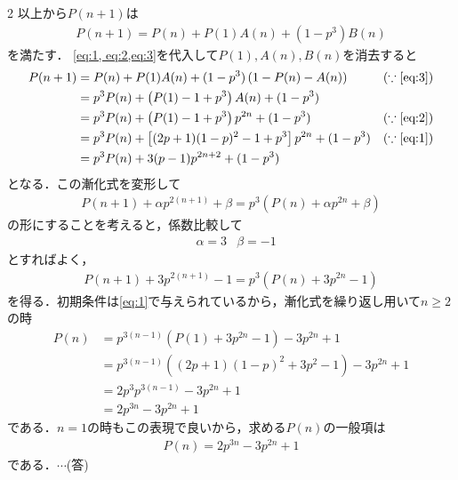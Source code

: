 \documentclass[../../main.tex]{subfiles}
\begin{document}
\begin{multicols}{2}
  以上から$P(n+1)$は
  \begin{align}
    P(n+1) = P(n) + P(1)A(n) + (1-p^3) B(n)
  \end{align}
  を満たす．
  \cref{eq:1, eq:2,eq:3}を代入して$P(1),A(n),B(n)$を消去すると
  \begin{align}
    P(n+1)
    & = P(n) + P(1)A(n) + (1-p^3) \left(1-P(n)-A(n)\right)         & (\because \text{\cref{eq:3}}) \\
    & = p^3P(n) + \left(P(1)-1+p^3\right)A(n) + (1-p^3)            &                                      \\
    & = p^3P(n) + \left(P(1)-1+p^3\right)p^{2n} + (1-p^3)          & (\because \text{\cref{eq:2}}) \\
    & = p^3P(n) + \left[(2p+1)(1-p)^2-1+p^3\right]p^{2n} + (1-p^3) & (\because \text{\cref{eq:1}}) \\
    & = p^3P(n) + 3(p-1)p^{2n+2} + (1-p^3)                         &
  \end{align}
  となる．この漸化式を変形して
  \begin{align}
    P(n+1) + \alpha p^{2(n+1)} + \beta = p^3\left(P(n)+\alpha p^{2n}+\beta \right)
  \end{align}
  の形にすることを考えると，係数比較して
  \begin{align}
    & \alpha= 3 & \beta = -1
  \end{align}
  とすればよく，
  \begin{align}
    P(n+1) + 3p^{2(n+1)} -1 = p^3\left(P(n)+ 3p^{2n}-1\right)
  \end{align}
  を得る．初期条件は\cref{eq:1}で与えられているから，漸化式を繰り返し用いて$n\ge 2$の時
  \begin{align}
    P(n)
    & = p^{3(n-1)}\left(P(1)+ 3p^{2n}-1\right) - 3p^{2n} + 1         \\
    & = p^{3(n-1)}\left((2p+1)(1-p)^2+ 3p^{2}-1\right) - 3p^{2n} + 1 \\
    & = 2p^3p^{3(n-1)} - 3p^{2n} + 1                                 \\
    & = 2p^{3n} - 3p^{2n} + 1
  \end{align}
  である．$n=1$の時もこの表現で良いから，求める$P(n)$の一般項は
  \begin{align}
    P(n) = 2p^{3n} - 3p^{2n} + 1
  \end{align}
  である．$\cdots$(答)


\end{multicols}
\end{document}
